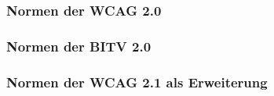 \subsubsection{Normen der \ac{WCAG} 2.0}

\subsubsection{Normen der \ac{BITV} 2.0}


\subsubsection{Normen der \ac{WCAG} 2.1 als Erweiterung}
\label{subsec: Normen der WCAG 2.1}
